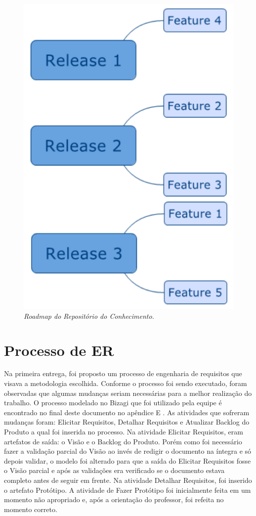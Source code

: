 \begin{figure}[H]
\centering\includegraphics[scale=0.5]{figuras/roadmap.png}
\caption{\textit{Roadmap do Repositório do Conhecimento.}}
\end{figure}

\section{Processo de ER}
Na primeira entrega, foi proposto um processo de engenharia de requisitos que visava a metodologia escolhida. Conforme o processo foi sendo executado, foram observadas que algumas mudanças seriam necessárias para a melhor realização do trabalho. O processo modelado no Bizagi que foi utilizado pela equipe é encontrado no final deste documento no apêndice  E . As atividades que sofreram mudanças foram: Elicitar Requisitos, Detalhar Requisitos e Atualizar Backlog do Produto a qual foi inserida no processo. Na atividade Elicitar Requisitos, eram artefatos de saída: o Visão e o Backlog do Produto. Porém como foi necessário fazer a validação parcial do Visão ao invés de redigir o documento na íntegra e só depois validar, o modelo foi alterado para que a saída do Elicitar Requisitos fosse o Visão parcial e após as validações era verificado se o documento estava completo antes de seguir em frente.  Na atividade Detalhar Requisitos, foi inserido o artefato Protótipo. A atividade de Fazer Protótipo foi inicialmente feita em um momento não apropriado e, após a orientação do professor, foi refeita no momento correto. 

